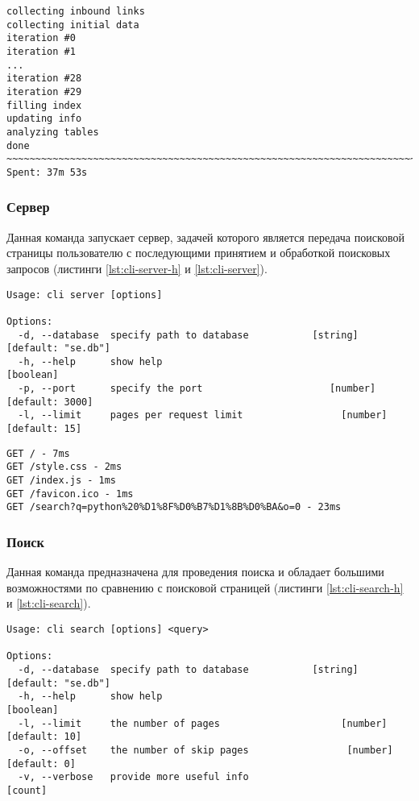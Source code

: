 \begin{lstlisting}[caption=Интерфейс командной строки: постобработка., label=lst:cli-pagerank]
collecting inbound links
collecting initial data
iteration #0
iteration #1
...
iteration #28
iteration #29
filling index
updating info
analyzing tables
done
~~~~~~~~~~~~~~~~~~~~~~~~~~~~~~~~~~~~~~~~~~~~~~~~~~~~~~~~~~~~~~~~~~~~~~~~~~~~~~
Spent: 37m 53s
\end{lstlisting}


\subsubsection*{Сервер}
Данная команда запускает сервер, задачей которого является передача поисковой страницы пользователю с последующими принятием и обработкой поисковых запросов (листинги \ref{lst:cli-server-h} и \ref{lst:cli-server}).
\begin{lstlisting}[caption=Интерфейс командной строки: сервер., label=lst:cli-server-h]
Usage: cli server [options]

Options:
  -d, --database  specify path to database           [string] [default: "se.db"]
  -h, --help      show help                                            [boolean]
  -p, --port      specify the port                      [number] [default: 3000]
  -l, --limit     pages per request limit                 [number] [default: 15]
\end{lstlisting}

\begin{lstlisting}[caption=Интерфейс командной строки: сервер., label=lst:cli-server]
GET / - 7ms
GET /style.css - 2ms
GET /index.js - 1ms
GET /favicon.ico - 1ms
GET /search?q=python%20%D1%8F%D0%B7%D1%8B%D0%BA&o=0 - 23ms
\end{lstlisting}


\subsubsection*{Поиск}
Данная команда предназначена для проведения поиска и обладает большими возможностями по сравнению с поисковой страницей (листинги \ref{lst:cli-search-h} и \ref{lst:cli-search}).
\begin{lstlisting}[caption=Интерфейс командной строки: поиск., label=lst:cli-search-h]
Usage: cli search [options] <query>

Options:
  -d, --database  specify path to database           [string] [default: "se.db"]
  -h, --help      show help                                            [boolean]
  -l, --limit     the number of pages                     [number] [default: 10]
  -o, --offset    the number of skip pages                 [number] [default: 0]
  -v, --verbose   provide more useful info                               [count]
\end{lstlisting}

